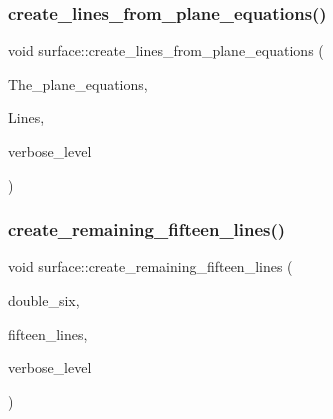 \mbox{\label{classsurface_a28da2c8268ecf7fa33c032dc818479bc}} 
\subsubsection{\texorpdfstring{create\+\_\+lines\+\_\+from\+\_\+plane\+\_\+equations()}{create\_lines\_from\_plane\_equations()}}
{\footnotesize\ttfamily void surface\+::create\+\_\+lines\+\_\+from\+\_\+plane\+\_\+equations (\begin{DoxyParamCaption}\item[{\mbox{\hyperlink{galois_8h_a09fddde158a3a20bd2dcadb609de11dc}{I\+NT}} $\ast$}]{The\+\_\+plane\+\_\+equations,  }\item[{\mbox{\hyperlink{galois_8h_a09fddde158a3a20bd2dcadb609de11dc}{I\+NT}} $\ast$}]{Lines,  }\item[{\mbox{\hyperlink{galois_8h_a09fddde158a3a20bd2dcadb609de11dc}{I\+NT}}}]{verbose\+\_\+level }\end{DoxyParamCaption})}

\mbox{\label{classsurface_a8c9b2380670ce7cd1e143d98d30b60d4}} 
\subsubsection{\texorpdfstring{create\+\_\+remaining\+\_\+fifteen\+\_\+lines()}{create\_remaining\_fifteen\_lines()}}
{\footnotesize\ttfamily void surface\+::create\+\_\+remaining\+\_\+fifteen\+\_\+lines (\begin{DoxyParamCaption}\item[{\mbox{\hyperlink{galois_8h_a09fddde158a3a20bd2dcadb609de11dc}{I\+NT}} $\ast$}]{double\+\_\+six,  }\item[{\mbox{\hyperlink{galois_8h_a09fddde158a3a20bd2dcadb609de11dc}{I\+NT}} $\ast$}]{fifteen\+\_\+lines,  }\item[{\mbox{\hyperlink{galois_8h_a09fddde158a3a20bd2dcadb609de11dc}{I\+NT}}}]{verbose\+\_\+level }\end{DoxyParamCaption})}

